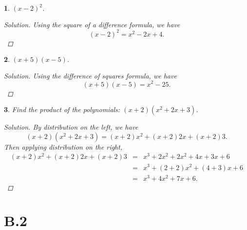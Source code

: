 \documentclass[12pt]{amsart}
\newtheorem{thm}{}
\begin{document}
\begin{thm}
  $(x - 2)^2$.
  \begin{proof}[Solution]
    Using the square of a difference formula, we have
    $$(x - 2)^2 = x^2 - 2x + 4.$$
  \end{proof}
\end{thm}

\setcounter{thm}{44}
\begin{thm}
  $(x + 5)(x - 5)$.
  
  \begin{proof}[Solution]
    Using the difference of squares formula, we have
    $$(x + 5)(x - 5) = x^2 - 25.$$
  \end{proof}
\end{thm}

\setcounter{thm}{60}
\begin{thm}
  Find the product of the polynomials: $(x + 2)(x^2 + 2x + 3)$.
  \begin{proof}[Solution]
    By distribution on the left, we have
    $$(x + 2)(x^2 + 2x + 3) = (x + 2)x^2 + (x + 2)2x + (x + 2)3.$$
    Then applying distribution on the right, 
    \begin{eqnarray*}
      (x + 2)x^2 + (x+2)2x + (x + 2)3 &=& x^3 + 2x^2 + 2x^2 + 4x + 3x + 6\\
      &=& x^3 + (2 + 2)x^2 + (4 + 3)x + 6\\
      &=& x^3 + 4x^2 + 7x + 6.
    \end{eqnarray*}
  \end{proof}
\end{thm}

\section*{B.2}
\end{document}
